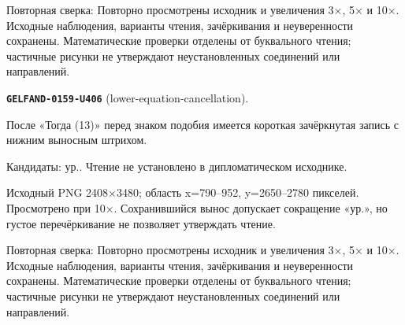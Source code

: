 Повторная сверка: Повторно просмотрены исходник и увеличения 3×, 5× и 10×. Исходные наблюдения, варианты чтения, зачёркивания и неуверенности сохранены. Математические проверки отделены от буквального чтения; частичные рисунки не утверждают неустановленных соединений или направлений.\par\medskip
\par\noindent\leavevmode{}\label{GELFAND-0159-U406}\label{GELFAND-P001470:lower-equation-cancellation}\textbf{\texttt{GELFAND-0159-U406}} (lower-equation-cancellation).\nopagebreak[4]\par
После «Тогда (13)» перед знаком подобия имеется короткая зачёркнутая запись с нижним выносным штрихом.\par
Кандидаты: ур.. Чтение не установлено в дипломатическом исходнике.\par
Исходный PNG 2408×3480; область x=790–952, y=2650–2780 пикселей. Просмотрено при 10×. Сохранившийся вынос допускает сокращение «ур.», но густое перечёркивание не позволяет утверждать чтение.\par
Повторная сверка: Повторно просмотрены исходник и увеличения 3×, 5× и 10×. Исходные наблюдения, варианты чтения, зачёркивания и неуверенности сохранены. Математические проверки отделены от буквального чтения; частичные рисунки не утверждают неустановленных соединений или направлений.\par\medskip
